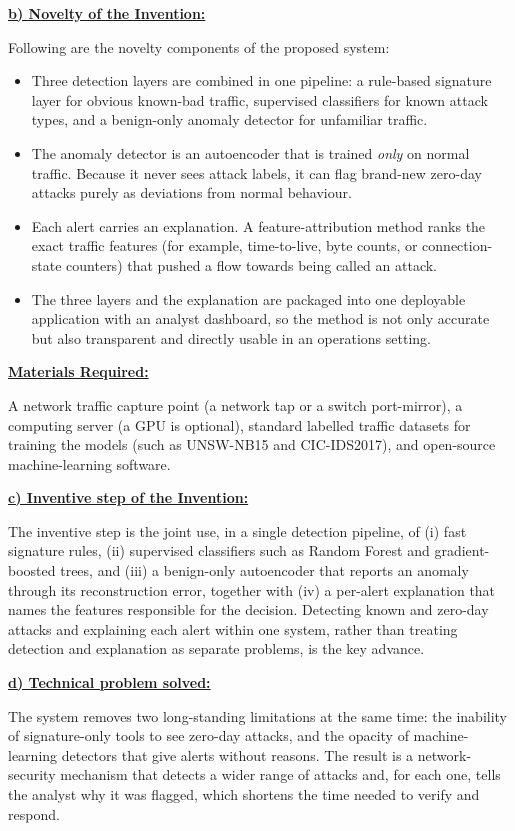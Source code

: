 \documentclass[12pt]{article}
\newcommand{\shead}[1]{\vspace{2pt}\textbf{\underline{#1}}\par}
\begin{document}
\clearpage
\shead{b) Novelty of the Invention:}
Following are the novelty components of the proposed system:
\begin{itemize}[leftmargin=1.4em,itemsep=4pt]
  \item Three detection layers are combined in one pipeline: a rule-based signature
  layer for obvious known-bad traffic, supervised classifiers for known attack types,
  and a benign-only anomaly detector for unfamiliar traffic.
  \item The anomaly detector is an autoencoder that is trained \emph{only} on normal
  traffic. Because it never sees attack labels, it can flag brand-new zero-day attacks
  purely as deviations from normal behaviour.
  \item Each alert carries an explanation. A feature-attribution method ranks the exact
  traffic features (for example, time-to-live, byte counts, or connection-state
  counters) that pushed a flow towards being called an attack.
  \item The three layers and the explanation are packaged into one deployable
  application with an analyst dashboard, so the method is not only accurate but also
  transparent and directly usable in an operations setting.
\end{itemize}

\shead{Materials Required:}
A network traffic capture point (a network tap or a switch port-mirror), a computing
server (a GPU is optional), standard labelled traffic datasets for training the models
(such as UNSW-NB15 and CIC-IDS2017), and open-source machine-learning software.

\clearpage
\shead{c) Inventive step of the Invention:}
The inventive step is the joint use, in a single detection pipeline, of (i) fast
signature rules, (ii) supervised classifiers such as Random Forest and gradient-boosted
trees, and (iii) a benign-only autoencoder that reports an anomaly through its
reconstruction error, together with (iv) a per-alert explanation that names the features
responsible for the decision. Detecting known and zero-day attacks and explaining each
alert within one system, rather than treating detection and explanation as separate
problems, is the key advance.

\clearpage
\shead{d) Technical problem solved:}
The system removes two long-standing limitations at the same time: the inability of
signature-only tools to see zero-day attacks, and the opacity of machine-learning
detectors that give alerts without reasons. The result is a network-security mechanism
that detects a wider range of attacks and, for each one, tells the analyst why it was
flagged, which shortens the time needed to verify and respond.
\end{document}
